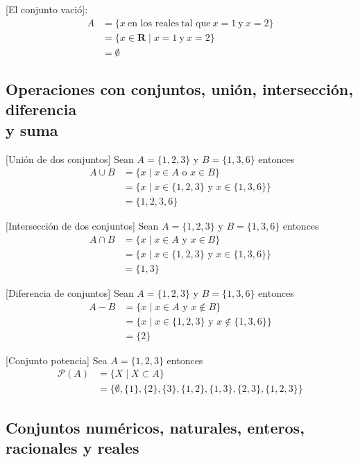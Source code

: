 	[El conjunto vació]:
	\begin{align}
		A 
		&= \{x\ \text{en los reales}\  \text{tal que}\ x=1\ \text{y}\ x=2 \}\\
		&= \{x \in \textbf{R}  \mid x=1\ \text{y}\ x=2 \}\\
		&= \emptyset
	\end{align}


\subsection{Operaciones con conjuntos, unión, intersección, diferencia \\ y suma}


	[Unión de dos conjuntos] Sean \(A = \{1,2,3\}\) y \(B=\{1,3,6\}\) entonces
	\begin{align}
		A \cup B &= \{x \mid x \in A \text{ o } x \in B \} \\
			&= \{x \mid x \in \{1,2,3\} \text{ y } x \in \{1,3,6\} \} \\
			&= \{1,2,3,6\} 
	\end{align}


	[Intersección de dos conjuntos] Sean \(A = \{1,2,3\}\) y \(B=\{1,3,6\}\) entonces
	\begin{align}
		A \cap B &= \{x \mid x \in A \text{ y } x \in B \} \\
			&= \{x \mid x \in \{1,2,3\} \text{ y } x \in \{1,3,6\} \} \\
			&= \{ 1, 3 \} 
	\end{align}

	[Diferencia de conjuntos] Sean \(A = \{1,2,3\}\) y \(B=\{1,3,6\}\) entonces
	\begin{align}
		A - B &= \{x \mid x \in A \text{ y } x \notin B \} \\
			&= \{x \mid x \in \{1,2,3\} \text{ y } x \notin \{1,3,6\} \} \\
			&= \{2\} 
	\end{align}


	[Conjunto potencia] Sea \(A = \{1,2,3\}\) entonces
	\begin{align}
		\mathcal{P}(A) &= \{X  \mid X \subset A \} \\
			&= \{\emptyset, \{1\}, \{2\}, \{3\}, \{1,2\}, \{1,3\}, \{2,3\}, \{1,2,3\}\} 
	\end{align}

\subsection{Conjuntos numéricos, naturales, enteros, racionales y reales}

